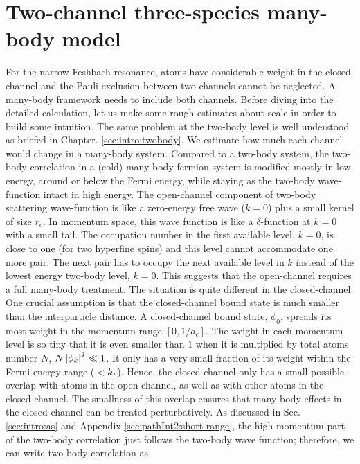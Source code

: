 
\chapter{Two-channel three-species many-body model\label{ch:path2}}


For the narrow Feshbach resonance, atoms have considerable weight in the closed-channel and the Pauli exclusion between two channels cannot be neglected.  A many-body framework needs to include both channels.  Before diving into the detailed calculation, let us make some rough estimates about scale in order to  build some intuition.  The same problem at the two-body level is well understood as briefed in Chapter. \ref{sec:intro:twobody}.  %
We estimate how much each channel would change  in a many-body system.  Compared to a two-body system, the two-body correlation in a (cold) many-body fermion system is modified mostly in  low  energy,  around or below the Fermi energy, while staying  as  the two-body wave-function intact in high energy.  The open-channel component  of two-body scattering wave-function is like a zero-energy free wave ($k=0$) plus a small kernel of size $r_c$.  In momentum space, this wave function is like a $\delta$-function at $k=0$ with a small tail.  The occupation number in the first available level, $k=0$, is close to one (for two hyperfine spins) and this level cannot accommodate one more pair.  The next pair has to occupy the next available level in $k$ instead of the lowest energy two-body level, $k=0$.  This suggests that the open-channel requires a full many-body treatment.  The situation is quite different in the closed-channel.   One crucial assumption is that  the closed-channel bound state is much smaller than the interparticle distance. A closed-channel bound state,  $\phi_{0}$, spreads its most weight  in the  momentum range $[0,1/a_{c}]$.  The weight in each momentum level is so tiny that it is even smaller than $1$ when it is multiplied by total atoms number $N$, $N\left\lvert{\phi_{k}}\right\rvert^{2}\ll1$.             It only has a very small fraction of its weight within the Fermi energy range ($<k_{F}$).  Hence, the closed-channel only has a small possible overlap with atoms in  the open-channel, as well as with other atoms in the closed-channel.  The smallness of this overlap ensures that many-body effects in the closed-channel can be  treated perturbatively.  As discussed in Sec. \ref{sec:intro:as} and Appendix \ref{sec:pathInt2:short-range}, the high momentum part of the two-body correlation just follows the two-body wave function;  therefore, we can write two-body correlation as 
